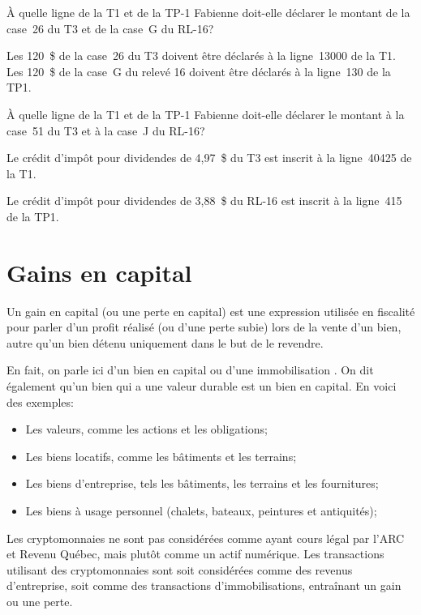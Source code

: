\setcounter{sousQuestion}{0}
\begin{sousQuestion}
	À quelle ligne de la T1 et de la TP-1 Fabienne doit-elle déclarer le montant de la case~26 du T3 et de la case~G du RL-16?
\end{sousQuestion}
Les 120~\$ de la case~26 du T3 doivent être déclarés à la ligne~13000 de la T1. Les 120~\$ de la case~G du relevé 16 doivent être déclarés à la ligne~130 de la TP1.

\begin{sousQuestion}
	À quelle ligne de la T1 et de la TP-1 Fabienne doit-elle déclarer le montant à la case~51 du T3 et à la case~J du RL-16? 
\end{sousQuestion}
Le crédit d'impôt pour dividendes de 4,97~\$ du T3 est inscrit à la ligne~40425 de la T1.

Le crédit d'impôt pour dividendes de 3,88~\$ du RL-16 est inscrit à la ligne~415 de la TP1.



\section{Gains en capital}
\begin{intro}
	Un gain en capital (ou une perte en capital) est une expression utilisée en fiscalité pour parler d'un profit réalisé (ou d'une perte subie) lors de la vente d'un bien, autre qu'un bien détenu uniquement dans le but de le revendre.
\end{intro}

En fait, on parle ici d'un bien en capital ou d'une \og immobilisation \fg{}. On dit également qu'un bien qui a une valeur durable est un bien en capital. En voici des exemples:
\begin{itemize}
	\item Les valeurs, comme les actions et les obligations;
	\item Les biens locatifs, comme les bâtiments et les terrains;
	\item Les biens d'entreprise, tels les bâtiments, les terrains et les fournitures; 
	\item Les biens à usage personnel (chalets, bateaux, peintures et antiquités);
\end{itemize}

Les cryptomonnaies ne sont pas considérées comme ayant cours légal par l'ARC et Revenu Québec, mais plutôt comme un actif numérique. Les transactions utilisant des cryptomonnaies sont soit considérées comme des revenus d'entreprise, soit comme des transactions d'immobilisations, entraînant un gain ou une perte.

